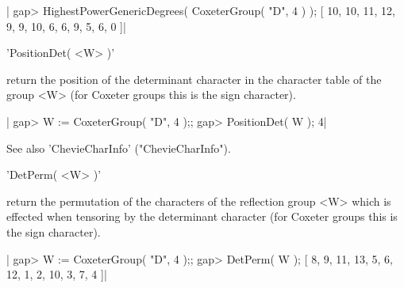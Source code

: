 |    gap> HighestPowerGenericDegrees( CoxeterGroup( "D", 4 ) );
    [ 10, 10, 11, 12, 9, 9, 10, 6, 6, 9, 5, 6, 0 ]|


'PositionDet( <W> )'

return  the position of the determinant character in the character table of
the group <W> (for Coxeter groups this is the sign character).

|    gap> W := CoxeterGroup( "D", 4 );;
    gap> PositionDet( W );
    4|

See also 'ChevieCharInfo' ("ChevieCharInfo").


'DetPerm( <W> )'

return  the permutation of the characters of the reflection group <W> which
is effected when tensoring by the determinant character (for Coxeter groups
this is the sign character).

|    gap> W := CoxeterGroup( "D", 4 );;
    gap> DetPerm( W );
    [ 8, 9, 11, 13, 5, 6, 12, 1, 2, 10, 3, 7, 4 ]|

